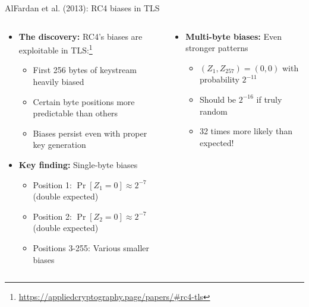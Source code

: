 \documentclass[aspectratio=169, lualatex, handout]{beamer}
\begin{document}
\begin{frame}{AlFardan et al. (2013): RC4 biases in TLS}
	\begin{columns}[c]
		\begin{column}{0.6\textwidth}
			\begin{itemize}[<+->]
				\item \textbf{The discovery:} RC4's biases are exploitable in TLS:\footnote{\url{https://appliedcryptography.page/papers/\#rc4-tls}}
				      \begin{itemize}[<+->]
					      \item First 256 bytes of keystream heavily biased
					      \item Certain byte positions more predictable than others
					      \item Biases persist even with proper key generation
				      \end{itemize}
				\item \textbf{Key finding:} Single-byte biases
				      \begin{itemize}[<+->]
					      \item Position 1: $\Pr[Z_1 = 0] \approx 2^{-7}$ (double expected)
					      \item Position 2: $\Pr[Z_2 = 0] \approx 2^{-7}$ (double expected)
					      \item Positions 3-255: Various smaller biases
				      \end{itemize}
			\end{itemize}
		\end{column}
		\begin{column}{0.4\textwidth}
			\begin{itemize}[<+->]
				\item \textbf{Multi-byte biases:} Even stronger patterns
				      \begin{itemize}[<+->]
					      \item $(Z_1, Z_{257}) = (0, 0)$ with probability $2^{-11}$
					      \item Should be $2^{-16}$ if truly random
					      \item 32 times more likely than expected!
				      \end{itemize}
			\end{itemize}
		\end{column}
	\end{columns}
\end{frame}
\end{document}
